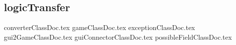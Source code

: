 \subsection{logicTransfer}
\label{ss:logicTransfer}
{converterClassDoc.tex}
{gameClassDoc.tex}
{exceptionClassDoc.tex}
{gui2GameClassDoc.tex}
{guiConnectorClassDoc.tex}
{possibleFieldClassDoc.tex}


